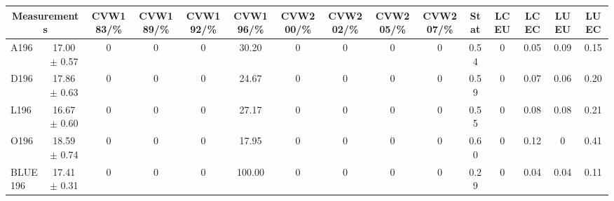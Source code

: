 \begin{table}[H]
\scriptsize
\begin{center}
\renewcommand{\arraystretch}{1.1}
\begin{tabular}{|lc|c|c|c|c|c|c|c|c|ccccc|}
\hline
\multicolumn{2}{|c|}{Measurements} & CVW{\tiny 183}/\%  & CVW{\tiny 189}/\%  & CVW{\tiny 192}/\%  & CVW{\tiny 196}/\%  & CVW{\tiny 200}/\%  & CVW{\tiny 202}/\%  & CVW{\tiny 205}/\%  & CVW{\tiny 207}/\%  & {\tiny Stat} & {\tiny LCEU} & {\tiny LCEC} & {\tiny LUEU} & {\tiny LUEC}\\
\hline
A196 &      17.00 $\pm$       0.57 &  0 &  0 &  0 &      30.20 &  0 &  0 &  0 &  0 &       0.54 &  0 &       0.05 &       0.09 &       0.15\\
D196 &      17.86 $\pm$       0.63 &  0 &  0 &  0 &      24.67 &  0 &  0 &  0 &  0 &       0.59 &  0 &       0.07 &       0.06 &       0.20\\
L196 &      16.67 $\pm$       0.60 &  0 &  0 &  0 &      27.17 &  0 &  0 &  0 &  0 &       0.55 &  0 &       0.08 &       0.08 &       0.21\\
O196 &      18.59 $\pm$       0.74 &  0 &  0 &  0 &      17.95 &  0 &  0 &  0 &  0 &       0.60 &  0 &       0.12 &  0 &       0.41\\
\hline
BLUE {\tiny 196} &      17.41 $\pm$       0.31 &  0 &  0 &  0 &     100.00 &  0 &  0 &  0 &  0 &       0.29 &  0 &       0.04 &       0.04 &       0.11\\
\hline
\end{tabular}
\renewcommand{\arraystretch}{1}
\end{center}
\end{table}
\vspace*{-0.5cm}
